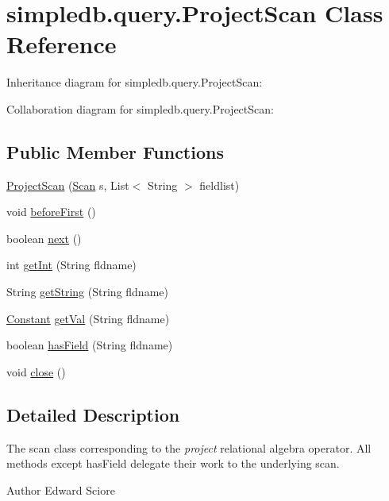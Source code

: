 \hypertarget{classsimpledb_1_1query_1_1ProjectScan}{}\section{simpledb.\+query.\+Project\+Scan Class Reference}
\label{classsimpledb_1_1query_1_1ProjectScan}


Inheritance diagram for simpledb.\+query.\+Project\+Scan\+:


Collaboration diagram for simpledb.\+query.\+Project\+Scan\+:
\subsection*{Public Member Functions}
\begin{DoxyCompactItemize}
\item 
\hyperlink{classsimpledb_1_1query_1_1ProjectScan_a897ca2e090e0978dcc3f9b1c36127b0d}{Project\+Scan} (\hyperlink{interfacesimpledb_1_1query_1_1Scan}{Scan} s, List$<$ String $>$ fieldlist)
\item 
void \hyperlink{classsimpledb_1_1query_1_1ProjectScan_ab34d4470b97f47e22879911fb71eeca6}{before\+First} ()
\item 
boolean \hyperlink{classsimpledb_1_1query_1_1ProjectScan_ae90eaf25301873aba0a2f743becf7c9a}{next} ()
\item 
int \hyperlink{classsimpledb_1_1query_1_1ProjectScan_a89039656c72ea917c18442e8f3627d14}{get\+Int} (String fldname)
\item 
String \hyperlink{classsimpledb_1_1query_1_1ProjectScan_afaf845b45f703794f37b6c48d68a753a}{get\+String} (String fldname)
\item 
\hyperlink{classsimpledb_1_1query_1_1Constant}{Constant} \hyperlink{classsimpledb_1_1query_1_1ProjectScan_a519337a8db86470d88e8bc24c068e53b}{get\+Val} (String fldname)
\item 
boolean \hyperlink{classsimpledb_1_1query_1_1ProjectScan_aff65421fc21f24723e730cb1d26fa6ed}{has\+Field} (String fldname)
\item 
void \hyperlink{classsimpledb_1_1query_1_1ProjectScan_a192669ae4807d1f623fe6200fe37522f}{close} ()
\end{DoxyCompactItemize}


\subsection{Detailed Description}
The scan class corresponding to the {\itshape project} relational algebra operator. All methods except has\+Field delegate their work to the underlying scan. \begin{DoxyAuthor}{Author}
Edward Sciore 
\end{DoxyAuthor}


